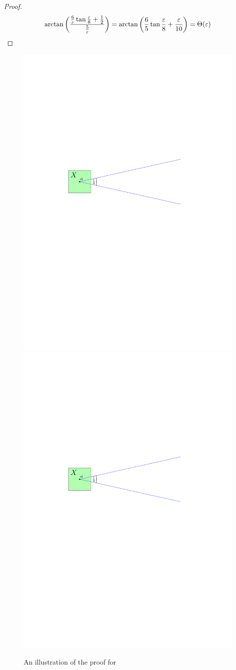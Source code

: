 \documentclass[12pt]{article}%
\begin{document}
\begin{proof}
    \begin{equation*}
    	\arctan\left(\frac{\frac{6}{\eps}\tan\frac{\eps}{8}+\frac{1}{2}}{\frac{5}{\eps}}\right)%
    	=%
    	\arctan \left( \frac{6}{5}\tan\frac{\eps}{8}+\frac{\eps}{10} \right)%
    	=%
    	\Theta(\eps)%
    \end{equation*}


\end{proof}

\begin{figure}[h]
    \phantom{}\hfill%
    \includegraphics[page=2, width=0.48\linewidth]{figs/double_wedge}%
    \hfill%
    \includegraphics[page=3, width=0.48\linewidth]{figs/double_wedge}%
    \hfill%
    \phantom{}%
    \caption{An illustration of the proof for }
\end{figure}
\end{document}
